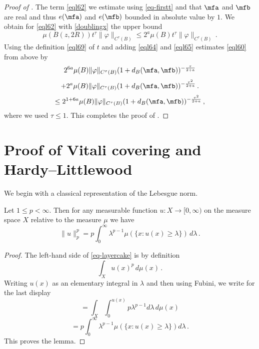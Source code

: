\begin{proof}[Proof of ]
The term \eqref{eql62} we estimate using
\eqref{eq-firstt} and that
$\mfa$ and $\mfb$ are real and thus $e(\mfa)$ and
$e(\mfb)$ bounded in absolute value by $1$.
We obtain for \eqref{eql62} with \eqref{doublingx}
the upper bound
  \begin{equation}\label{eql65}
      \mu(B(z,2R)) t^{\tau} \|\varphi\|_{C^\tau(B)}
      \le 2^a \mu(B) t^{\tau} \|\varphi\|_{C^\tau(B)}
      \,.
 \end{equation}
Using the definition \eqref{eql69} of $t$ and adding
\eqref{eql64} and \eqref{eql65} estimates
\eqref{eql60} from above by
\begin{equation}
       2^{6a} \mu(B) \|{\varphi}\|_{C^\tau(B)}
       (1 + d_{B}(\mfa,\mfb))^{-\frac{\tau}{2+a}}
       \end{equation}
\begin{equation} +
        2^a \mu(B) \|{\varphi}\|_{C^\tau(B)}
       (1 + d_{B}(\mfa,\mfb))^{-\frac{\tau^2}{2+a}}\, .
 \end{equation}
\begin{equation}\label{eql66}
      \le 2^{1+6a} \mu(B) \|{\varphi}\|_{C^\tau(B)}
       (1 + d_{B}(\mfa,\mfb))^{-\frac{\tau^2}{2+a}} \, ,
 \end{equation}
where we used $\tau\le 1$.
This completes the proof of .
\end{proof}

\chapter{Proof of Vitali covering and Hardy--Littlewood}
\label{sec-hlm}


We begin with a classical representation of the Lebesgue norm.
\begin{lemma}\label{layer-cake-representation}
\leanok
{}
Let $1\le p< \infty$. Then for any measurable function $u:X\to [0,\infty)$ on the measure space $X$
relative to the measure $\mu$
we have
\begin{equation}\label{eq-layercake}
    \|u\|_p^p=p\int_0^\infty \lambda^{p-1}\mu(\{x: u(x)\ge \lambda\})\, d\lambda\, .
\end{equation}
\end{lemma}
\begin{proof}
    \leanok
    The left-hand side of \eqref{eq-layercake} is by definition
\begin{equation}
    \int_X u(x)^p \, d\mu(x)\, .\end{equation}
    Writing $u(x)$ as an elementary integral in $\lambda$ and then using Fubini, we write for the last display
    \begin{equation}
    =\int_X \int _0^{u(x)}
    p \lambda^{p-1} d\lambda\, d\mu(x)
\end{equation}
\begin{equation}
 =p\int _0^{\infty}
    \lambda^{p-1} \mu(\{x: u(x)\ge \lambda\}) d\lambda\, .
\end{equation}
This proves the lemma.
\end{proof}

